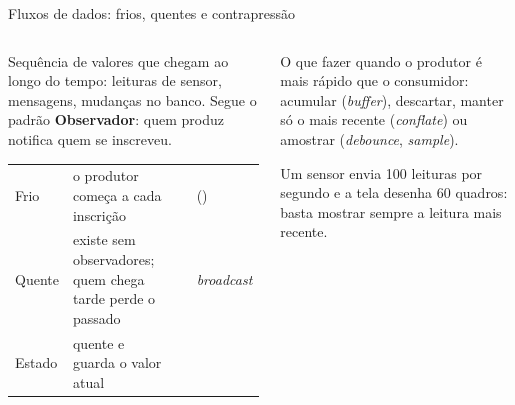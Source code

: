 \begin{frame}{Fluxos de dados: frios, quentes e contrapressão}
  \begin{columns}[T]
    \begin{column}{0.55\textwidth}
      \begin{definicao}
        Sequência de valores que chegam ao longo do tempo: leituras de sensor, mensagens, mudanças no banco. Segue o padrão \textbf{Observador}: quem produz notifica quem se inscreveu.
      \end{definicao}
      \scriptsize
      \begin{tabularx}{\linewidth}{@{}l L l l@{}}
        \toprule
         &  &  &  \\
        \midrule
        Frio & o produtor começa a cada inscrição &  &  () \\
        Quente & existe sem observadores; quem chega tarde perde o passado &  &  \emph{broadcast} \\
        Estado & quente e guarda o valor atual &  &  \\
        \bottomrule
      \end{tabularx}
    \end{column}
    \begin{column}{0.43\textwidth}
      \begin{definicao}
        O que fazer quando o produtor é mais rápido que o consumidor: acumular (\emph{buffer}), descartar, manter só o mais recente (\emph{conflate}) ou amostrar (\emph{debounce}, \emph{sample}).
      \end{definicao}
      \begin{exemplo}[No LabMonitor]
        Um sensor envia 100 leituras por segundo e a tela desenha 60 quadros: basta mostrar sempre a leitura mais recente.
      \end{exemplo}
    \end{column}
  \end{columns}
\end{frame}
